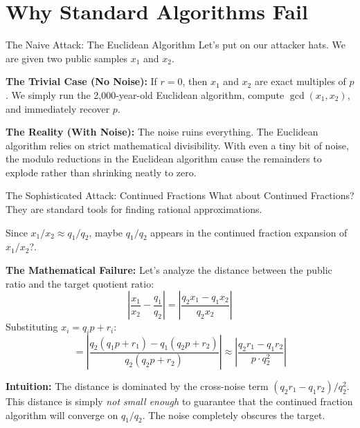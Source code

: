 \documentclass[10pt, aspectratio=169]{beamer}
\begin{document}
\section{Why Standard Algorithms Fail}
\begin{frame}{The Naive Attack: The Euclidean Algorithm}
    Let's put on our attacker hats. We are given two public samples $x_1$ and $x_2$.
    \pause
    
    \vspace{0.3cm}
    \textbf{The Trivial Case (No Noise):}
    If $r = 0$, then $x_1$ and $x_2$ are exact multiples of $p$. 
    We simply run the 2,000-year-old Euclidean algorithm, compute $\gcd(x_1, x_2)$, and immediately recover $p$.
    \pause
    
    \vspace{0.3cm}
    \textbf{The Reality (With Noise):}
    The noise ruins everything. The Euclidean algorithm relies on strict mathematical divisibility. With even a tiny bit of noise, the modulo reductions in the Euclidean algorithm cause the remainders to explode rather than shrinking neatly to zero.
\end{frame}

\begin{frame}{The Sophisticated Attack: Continued Fractions}
    What about Continued Fractions? They are standard tools for finding rational approximations.
    
    Since $x_1 / x_2 \approx q_1 / q_2$, maybe $q_1 / q_2$ appears in the continued fraction expansion of $x_1 / x_2$?.
    \pause
    
    \vspace{0.3cm}
    \textbf{The Mathematical Failure:}
    Let's analyze the distance between the public ratio and the target quotient ratio:
    $$ \left| \frac{x_1}{x_2} - \frac{q_1}{q_2} \right| = \left| \frac{q_2 x_1 - q_1 x_2}{q_2 x_2} \right| $$
    \pause
    Substituting $x_i = q_i p + r_i$:
    $$ = \left| \frac{q_2(q_1 p + r_1) - q_1(q_2 p + r_2)}{q_2(q_2 p + r_2)} \right| \approx \left| \frac{q_2 r_1 - q_1 r_2}{p \cdot q_2^2} \right| $$
    \pause
    
    \vspace{0.3cm}
    \textbf{Intuition:} The distance is dominated by the cross-noise term $(q_2 r_1 - q_1 r_2) / q_2^2$. This distance is simply \textit{not small enough} to guarantee that the continued fraction algorithm will converge on $q_1/q_2$. The noise completely obscures the target.
\end{frame}
\end{document}

